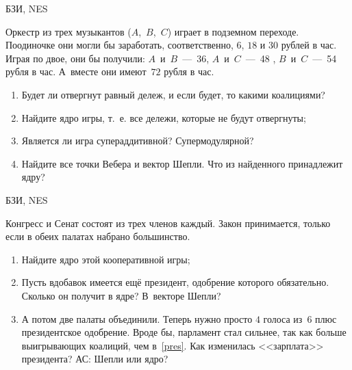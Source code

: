\begin{problem} 
\begin{source}
БЗИ, NES
\end{source}
 Оркестр из трех музыкантов
($A$,~$B$,~$C$) играет в подземном переходе. Поодиночке они
могли бы заработать, соответственно, $6$, $18$ и $30$
рублей в час. Играя по двое, они бы получили:
$A$~и~$B$~---~36, $A$~и~$C$~---~48 , $B$~и~$C$~---~54 рубля в час.
А~вместе они имеют~$72$ рубля в час.

\begin{enumerate}

\item Будет ли отвергнут равный дележ, и если будет, то
какими коалициями?

\item Найдите ядро игры, т.~е. все дележи, которые не будут
отвергнуты;

\item Является ли игра супераддитивной? Супермодулярной?

\item Найдите все точки Вебера и вектор Шепли. Что из
найденного принадлежит ядру?

\end{enumerate}






\begin{sol}

\end{sol}
\end{problem}





\begin{problem} [Парламент.]
\begin{source}
БЗИ, NES
\end{source} Конгресс и Сенат состоят из трех
членов каждый. Закон принимается, только если в обеих
палатах набрано большинство.

\begin{enumerate}

\item Найдите ядро этой кооперативной игры;

\item\label{pres} Пусть вдобавок имеется ещё президент,
одобрение которого обязательно. Сколько он получит в ядре?
В~векторе Шепли?

\item А потом две палаты объединили. Теперь нужно просто
$4$ голоса из~$6$ плюс президентское одобрение. Вроде бы,
парламент стал сильнее, так как больше выигрывающих
коалиций, чем в~\ref{pres}. Как изменилась <<зарплата>>
президента? {\red АС: Шепли или ядро?}

\end{enumerate}
\begin{sol}

\end{sol}
\end{problem}





